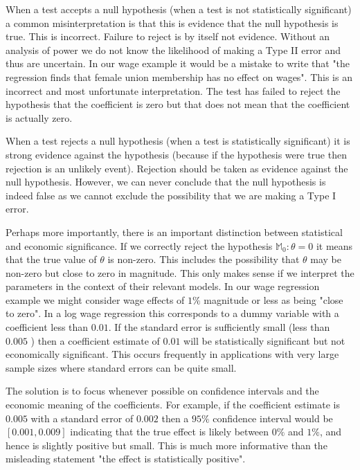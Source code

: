 \documentclass[10pt]{article}
\begin{document}
When a test accepts a null hypothesis (when a test is not statistically significant) a common misinterpretation is that this is evidence that the null hypothesis is true. This is incorrect. Failure to reject is by itself not evidence. Without an analysis of power we do not know the likelihood of making a Type II error and thus are uncertain. In our wage example it would be a mistake to write that "the regression finds that female union membership has no effect on wages". This is an incorrect and most unfortunate interpretation. The test has failed to reject the hypothesis that the coefficient is zero but that does not mean that the coefficient is actually zero.

When a test rejects a null hypothesis (when a test is statistically significant) it is strong evidence against the hypothesis (because if the hypothesis were true then rejection is an unlikely event). Rejection should be taken as evidence against the null hypothesis. However, we can never conclude that the null hypothesis is indeed false as we cannot exclude the possibility that we are making a Type I error.

Perhaps more importantly, there is an important distinction between statistical and economic significance. If we correctly reject the hypothesis $\mathbb{M}_{0}: \theta=0$ it means that the true value of $\theta$ is non-zero. This includes the possibility that $\theta$ may be non-zero but close to zero in magnitude. This only makes sense if we interpret the parameters in the context of their relevant models. In our wage regression example we might consider wage effects of $1 \%$ magnitude or less as being "close to zero". In a log wage regression this corresponds to a dummy variable with a coefficient less than $0.01$. If the standard error is sufficiently small (less than $0.005$ ) then a coefficient estimate of $0.01$ will be statistically significant but not economically significant. This occurs frequently in applications with very large sample sizes where standard errors can be quite small.

The solution is to focus whenever possible on confidence intervals and the economic meaning of the coefficients. For example, if the coefficient estimate is $0.005$ with a standard error of $0.002$ then a $95 \%$ confidence interval would be $[0.001,0.009]$ indicating that the true effect is likely between $0 \%$ and $1 \%$, and hence is slightly positive but small. This is much more informative than the misleading statement "the effect is statistically positive".
\end{document}
